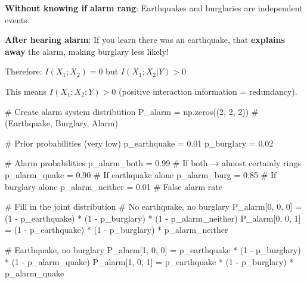 \documentclass[
  11pt,
  letterpaper,
  oneside,
  openany]{book}
\newenvironment{Shaded}{\begin{snugshade}}{\end{snugshade}}
\newcommand{\CommentTok}[1]{\textcolor[rgb]{0.37,0.37,0.37}{#1}}
\newcommand{\DecValTok}[1]{\textcolor[rgb]{0.68,0.00,0.00}{#1}}
\newcommand{\FloatTok}[1]{\textcolor[rgb]{0.68,0.00,0.00}{#1}}
\newcommand{\NormalTok}[1]{\textcolor[rgb]{0.00,0.23,0.31}{#1}}
\newcommand{\OperatorTok}[1]{\textcolor[rgb]{0.37,0.37,0.37}{#1}}
\begin{document}
\textbf{Without knowing if alarm rang}: Earthquakes and burglaries are
independent events.

\textbf{After hearing alarm}: If you learn there was an earthquake, that
\textbf{explains away} the alarm, making burglary less likely!

Therefore: \(I(X_1; X_2) = 0\) but \(I(X_1; X_2 | Y) > 0\)

This means \(I(X_1; X_2; Y) > 0\) (positive interaction information =
redundancy).

\begin{Shaded}
\begin{Highlighting}[]
\CommentTok{\# Create alarm system distribution}
\NormalTok{P\_alarm }\OperatorTok{=}\NormalTok{ np.zeros((}\DecValTok{2}\NormalTok{, }\DecValTok{2}\NormalTok{, }\DecValTok{2}\NormalTok{))  }\CommentTok{\# (Earthquake, Burglary, Alarm)}

\CommentTok{\# Prior probabilities (very low)}
\NormalTok{p\_earthquake }\OperatorTok{=} \FloatTok{0.01}
\NormalTok{p\_burglary }\OperatorTok{=} \FloatTok{0.02}

\CommentTok{\# Alarm probabilities}
\NormalTok{p\_alarm\_both }\OperatorTok{=} \FloatTok{0.99}  \CommentTok{\# If both → almost certainly rings}
\NormalTok{p\_alarm\_quake }\OperatorTok{=} \FloatTok{0.90}  \CommentTok{\# If earthquake alone}
\NormalTok{p\_alarm\_burg }\OperatorTok{=} \FloatTok{0.85}   \CommentTok{\# If burglary alone}
\NormalTok{p\_alarm\_neither }\OperatorTok{=} \FloatTok{0.01}  \CommentTok{\# False alarm rate}

\CommentTok{\# Fill in the joint distribution}
\CommentTok{\# No earthquake, no burglary}
\NormalTok{P\_alarm[}\DecValTok{0}\NormalTok{, }\DecValTok{0}\NormalTok{, }\DecValTok{0}\NormalTok{] }\OperatorTok{=}\NormalTok{ (}\DecValTok{1} \OperatorTok{{-}}\NormalTok{ p\_earthquake) }\OperatorTok{*}\NormalTok{ (}\DecValTok{1} \OperatorTok{{-}}\NormalTok{ p\_burglary) }\OperatorTok{*}\NormalTok{ (}\DecValTok{1} \OperatorTok{{-}}\NormalTok{ p\_alarm\_neither)}
\NormalTok{P\_alarm[}\DecValTok{0}\NormalTok{, }\DecValTok{0}\NormalTok{, }\DecValTok{1}\NormalTok{] }\OperatorTok{=}\NormalTok{ (}\DecValTok{1} \OperatorTok{{-}}\NormalTok{ p\_earthquake) }\OperatorTok{*}\NormalTok{ (}\DecValTok{1} \OperatorTok{{-}}\NormalTok{ p\_burglary) }\OperatorTok{*}\NormalTok{ p\_alarm\_neither}

\CommentTok{\# Earthquake, no burglary}
\NormalTok{P\_alarm[}\DecValTok{1}\NormalTok{, }\DecValTok{0}\NormalTok{, }\DecValTok{0}\NormalTok{] }\OperatorTok{=}\NormalTok{ p\_earthquake }\OperatorTok{*}\NormalTok{ (}\DecValTok{1} \OperatorTok{{-}}\NormalTok{ p\_burglary) }\OperatorTok{*}\NormalTok{ (}\DecValTok{1} \OperatorTok{{-}}\NormalTok{ p\_alarm\_quake)}
\NormalTok{P\_alarm[}\DecValTok{1}\NormalTok{, }\DecValTok{0}\NormalTok{, }\DecValTok{1}\NormalTok{] }\OperatorTok{=}\NormalTok{ p\_earthquake }\OperatorTok{*}\NormalTok{ (}\DecValTok{1} \OperatorTok{{-}}\NormalTok{ p\_burglary) }\OperatorTok{*}\NormalTok{ p\_alarm\_quake}


\end{Highlighting}
\end{Shaded}
\end{document}
